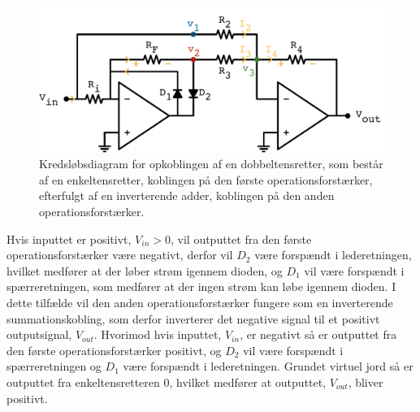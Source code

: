 %
\begin{figure}[H]
	\centering
	\includegraphics[resolution=300,scale=\circuitSize]{Figure/Circuits/Dobbeltensretter.pdf}
	\caption{Kredsløbsdiagram for opkoblingen af en dobbeltensretter, som består af en enkeltensretter, koblingen på den første operationsforstærker, efterfulgt af en inverterende adder, koblingen på den anden operationsforstærker.}
	\label{fig:Dobbeltensretter}
\end{figure}
\noindent
%
Hvis inputtet er positivt, $V_{in} > 0$, vil outputtet fra den første operationsforstærker være negativt, derfor vil $D_2$ være forspændt i lederetningen, hvilket medfører at der løber strøm igennem dioden, og $D_1$ vil være forspændt i spærreretningen, som medfører at der ingen strøm kan løbe igennem dioden. I dette tilfælde vil den anden operationsforstærker fungere som en inverterende summationskobling, som derfor inverterer det negative signal til et positivt outputsignal, $V_{out}$. Hvorimod hvis inputtet, $V_{in}$, er negativt så er outputtet fra den første operationsforstærker positivt, og $D_2$ vil være forspændt i spærreretningen og $D_1$ være forspændt i lederetningen. Grundet virtuel jord så er outputtet fra enkeltensretteren 0, hvilket medfører at outputtet, $V_{out}$, bliver positivt. 

